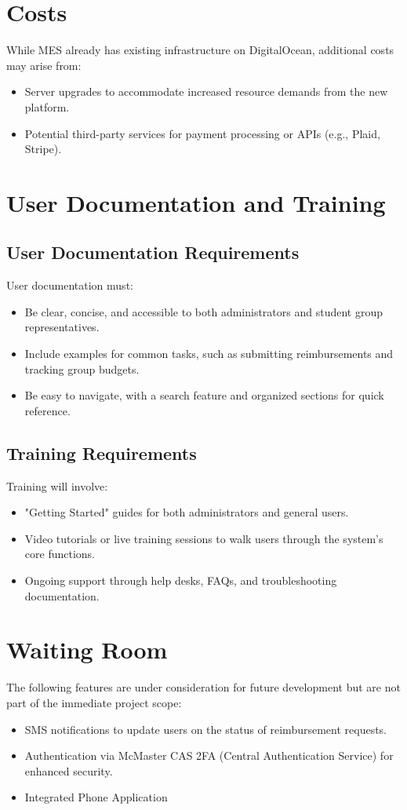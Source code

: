 \documentclass[12pt]{article}
\begin{document}
\section{Costs}
While MES already has existing infrastructure on DigitalOcean, additional costs may arise from:
\begin{itemize}
    \item Server upgrades to accommodate increased resource demands from the new platform.
    \item Potential third-party services for payment processing or APIs (e.g., Plaid, Stripe).
\end{itemize}


\section{User Documentation and Training}

\subsection{User Documentation Requirements}
User documentation must:
\begin{itemize}
    \item Be clear, concise, and accessible to both administrators and student group representatives.
    \item Include examples for common tasks, such as submitting reimbursements and tracking group budgets.
    \item Be easy to navigate, with a search feature and organized sections for quick reference.
\end{itemize}

\subsection{Training Requirements}
Training will involve:
\begin{itemize}
    \item "Getting Started" guides for both administrators and general users.
    \item Video tutorials or live training sessions to walk users through the system’s core functions.
    \item Ongoing support through help desks, FAQs, and troubleshooting documentation.
\end{itemize}

\section{Waiting Room}
The following features are under consideration for future development but are not part of the immediate project scope:
\begin{itemize}
    \item SMS notifications to update users on the status of reimbursement requests.
    \item Authentication via McMaster CAS 2FA (Central Authentication Service) for enhanced security.
    \item Integrated Phone Application
\end{itemize}
\end{document}
